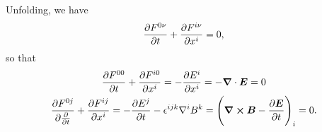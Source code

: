 {Unfolding, we have
\begin{align}
    \pdv{F^{0\nu}}{t} + \pdv{F^{i\nu}}{x^{i}} = 0
,\end{align}
so that
\begin{gather}
    \pdv{F^{00}}{t} + \pdv{F^{i 0}}{x^{i}} = -\pdv{E^{i}}{x^{i}} = -\grad \cdot \vb*{E} = 0 \nonumber \\
    \pdv{F^{0j}}{\pdv{t}} + \pdv{F^{ij}}{x^{i}} = -\pdv{E^{j}}{t} - \epsilon^{ijk} \nabla^{i} B^{k} = \Bigg( \grad \cross \vb*{B} - \pdv{\vb*{E}}{t} \Bigg)_{i} = 0
.\end{gather}


}
    


